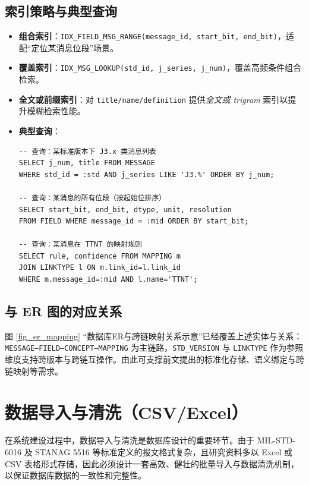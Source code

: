 \subsection{索引策略与典型查询}
\begin{itemize}
  \item \textbf{组合索引}：\texttt{IDX\_FIELD\_MSG\_RANGE(message\_id, start\_bit, end\_bit)}，适配“定位某消息位段”场景。
  \item \textbf{覆盖索引}：\texttt{IDX\_MSG\_LOOKUP(std\_id, j\_series, j\_num)}，覆盖高频条件组合检索。
  \item \textbf{全文或前缀索引}：对 \texttt{title/name/definition} 提供\emph{全文或 trigram} 索引以提升模糊检索性能。
  \item \textbf{典型查询}：
\begin{verbatim}
-- 查询：某标准版本下 J3.x 类消息列表
SELECT j_num, title FROM MESSAGE
WHERE std_id = :std AND j_series LIKE 'J3.%' ORDER BY j_num;

-- 查询：某消息的所有位段（按起始位排序）
SELECT start_bit, end_bit, dtype, unit, resolution
FROM FIELD WHERE message_id = :mid ORDER BY start_bit;

-- 查询：某消息在 TTNT 的映射规则
SELECT rule, confidence FROM MAPPING m
JOIN LINKTYPE l ON m.link_id=l.link_id
WHERE m.message_id=:mid AND l.name='TTNT';
\end{verbatim}
\end{itemize}

\subsection{与 ER 图的对应关系}
图 \ref{fig_er_mapping} “数据库ER与跨链映射关系示意”已经覆盖上述实体与关系：\texttt{MESSAGE–FIELD–CONCEPT–MAPPING} 为主链路，\texttt{STD\_VERSION} 与 \texttt{LINKTYPE} 作为参照维度支持跨版本与跨链互操作。由此可支撑前文提出的标准化存储、语义绑定与跨链映射等需求。

\section{数据导入与清洗（CSV/Excel）}

在系统建设过程中，数据导入与清洗是数据库设计的重要环节。由于 {MIL-STD-6016} 及 {STANAG 5516} 等标准定义的报文格式复杂，且研究资料多以 Excel 或 CSV 表格形式存储，因此必须设计一套高效、健壮的批量导入与数据清洗机制，以保证数据库数据的一致性和完整性。

